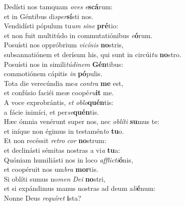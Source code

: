 \oddverse Dedísti nos tamquam \textit{o}\textit{ves} \textit{e}\textbf{scá}rum:~\*\\
\oddverse et in Géntibus di\textit{sper}\textbf{sí}sti nos.\\
\evenverse Vendidísti pópulum tu\textit{um} \textit{si}\textit{ne} \textbf{pré}tio:~\*\\
\evenverse et non fuit multitúdo in commutatiónibus \textit{e}\textbf{ó}rum.\\
\oddverse Posuísti nos oppróbrium \textit{vi}\textit{cí}\textit{nis} \textbf{no}stris,~\*\\
\oddverse subsannatiónem et derísum his, qui sunt in circúi\textit{tu} \textbf{no}stro.\\
\evenverse Posuísti nos in simili\textit{tú}\textit{di}\textit{nem} \textbf{Gén}tibus:~\*\\
\evenverse commotiónem cápitis \textit{in} \textbf{pó}pulis.\\
\oddverse Tota die verecúndia me\textit{a} \textit{con}\textit{tra} \textbf{me} est,~\*\\
\oddverse et confúsio faciéi meæ coopé\textit{ru}\textbf{it} me.\\
\evenverse A voce exprobrántis, \textit{et} \textit{o}\textit{blo}\textbf{quén}tis:~\*\\
\evenverse a fácie inimíci, et per\textit{se}\textbf{quén}tis.\\
\oddverse Hæc ómnia venérunt super nos, nec \textit{o}\textit{blí}\textit{ti} \textbf{su}mus te:~\*\\
\oddverse et iníque non égimus in testamén\textit{to} \textbf{tu}o.\\
\evenverse Et non recéssit \textit{re}\textit{tro} \textit{cor} \textbf{no}strum:~\*\\
\evenverse et declinásti sémitas nostras a vi\textit{a} \textbf{tu}a:\\
\oddverse Quóniam humiliásti nos in loco \textit{af}\textit{fli}\textit{cti}\textbf{ó}nis,~\*\\
\oddverse et coopéruit nos um\textit{bra} \textbf{mor}tis.\\
\evenverse Si oblíti sumus no\textit{men} \textit{De}\textit{i} \textbf{no}stri,~\*\\
\evenverse et si expándimus manus nostras ad deum a\textit{li}\textbf{é}num:\\
\oddverse Nonne Deus \textit{re}\textit{quí}\textit{ret} \textbf{i}sta?~\*\\
